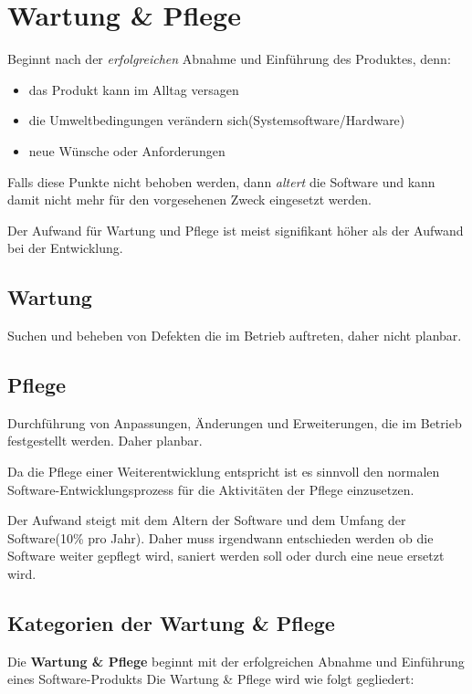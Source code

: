 \documentclass[a4paper]{article}
\theoremstyle{break}
\begin{document}
\section{Wartung \& Pflege}



Beginnt nach der \emph{erfolgreichen} Abnahme und Einführung des Produktes, denn:
\begin{itemize}
\item das Produkt kann im Alltag versagen
\item die Umweltbedingungen verändern sich(Systemsoftware/Hardware)
\item neue Wünsche oder Anforderungen
\end{itemize}

Falls diese Punkte nicht behoben werden, dann \emph{altert} die Software und kann damit nicht mehr für den vorgesehenen Zweck eingesetzt werden.

Der Aufwand für Wartung und Pflege ist meist signifikant höher als der Aufwand bei der Entwicklung.

\subsection{Wartung}
Suchen und beheben von Defekten die im Betrieb auftreten, daher nicht planbar.

\subsection{Pflege}
Durchführung von Anpassungen, Änderungen und Erweiterungen, die im Betrieb festgestellt werden. Daher planbar.

Da die Pflege einer Weiterentwicklung entspricht ist es sinnvoll den normalen Software-Entwicklungsprozess für die Aktivitäten der Pflege einzusetzen.

Der Aufwand steigt mit dem Altern der Software und dem Umfang der Software(10\% pro Jahr). Daher muss irgendwann entschieden werden ob die Software weiter gepflegt wird, saniert werden soll oder durch eine neue ersetzt wird.

\subsection{Kategorien der Wartung \& Pflege}

Die \textbf{Wartung \& Pflege} beginnt mit der erfolgreichen Abnahme und Einführung eines Software-Produkts
\newline Die Wartung \& Pflege wird wie folgt gegliedert:
\end{document}
